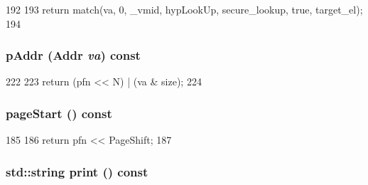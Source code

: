 \begin{DoxyCode}
192     {
193         return match(va, 0, _vmid, hypLookUp, secure_lookup, true, target_el);
194     }
\end{DoxyCode}
\hypertarget{structArmISA_1_1TlbEntry_ad851ad4bd44e8c1ce61ad96498197de8}{
\subsubsection[{pAddr}]{ pAddr ({\bf Addr} {\em va}) const}}
\label{structArmISA_1_1TlbEntry_ad851ad4bd44e8c1ce61ad96498197de8}



\begin{DoxyCode}
222     {
223         return (pfn << N) | (va & size);
224     }
\end{DoxyCode}
\hypertarget{structArmISA_1_1TlbEntry_ace6941a85652738b17b30edba098fb1f}{
\subsubsection[{pageStart}]{ pageStart () const}}
\label{structArmISA_1_1TlbEntry_ace6941a85652738b17b30edba098fb1f}



\begin{DoxyCode}
185     {
186         return pfn << PageShift;
187     }
\end{DoxyCode}
\hypertarget{structArmISA_1_1TlbEntry_ae8a5b5e9e0e6be3b115ee77fa7b4d0c8}{
\subsubsection[{print}]{\setlength{\rightskip}{0pt plus 5cm}std::string print () const}}
\label{structArmISA_1_1TlbEntry_ae8a5b5e9e0e6be3b115ee77fa7b4d0c8}



